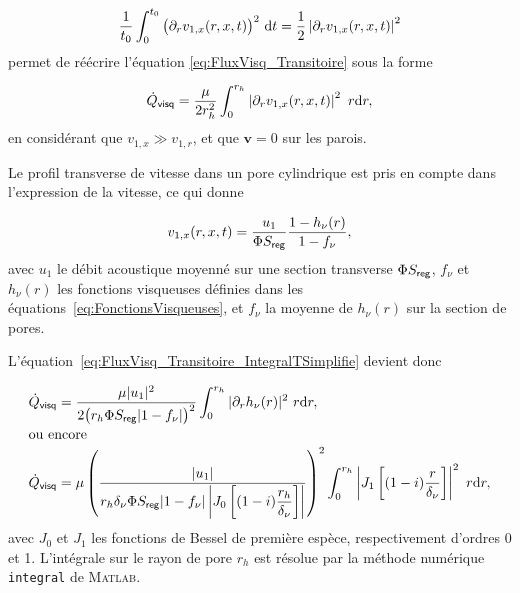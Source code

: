 \begin{enumerate}[label=\textbf{(\roman*)}]
\begin{equation*}
\frac{1}{t_0}\int_{0}^{t_0}\big(\partial_r v_{1,x}(r,x,t)\big)^2\ \mathrm{d} t = \frac12\left|\partial_r v_{1,x}(r,x,t)\right|^2
\end{equation*}
permet de réécrire l'équation \eqref{eq:FluxVisq_Transitoire} sous la forme

\begin{equation}
	\dot Q_{\sf visq} = \frac{\mu}{2r_h^2} \int_{0}^{r_h} \left|\partial_r v_{1,x}(r,x,t)\right|^2\ r \mathrm{d} r,
	\label{eq:FluxVisq_Transitoire_IntegralTSimplifie}
\end{equation}
en considérant que $v_{1,x} \gg v_{1,r}$, et que $\mathbf v=0$ sur les parois.

Le profil transverse de vitesse dans un pore cylindrique est pris en compte dans l'expression de la vitesse, ce qui donne 

\begin{equation}
	v_{1,x}(r,x,t) = \frac{u_1}{\Phi S_{\sf reg}} \frac{1-h_\nu(r)}{1-f_\nu},
	\label{eq:lienVitesseDebit_PoreCylindrique}
\end{equation}
avec $u_1$ le débit acoustique moyenné sur une section transverse $\Phi S_{\sf reg}$, $f_\nu$ et $h_\nu(r)$ les fonctions visqueuses définies dans les équations~\eqref{eq:FonctionsVisqueuses}, et $f_\nu$ la moyenne de $h_\nu(r)$ sur la section de pores.

L'équation~\eqref{eq:FluxVisq_Transitoire_IntegralTSimplifie} devient donc

\begin{align}
	\dot Q_{\sf visq} &= \frac{\mu |u_1|^2}{2\big(r_h\Phi S_{\sf reg}|1-f_\nu|\big)^2}\int_0^{r_h} |\partial_r h_\nu(r)|^2\ r \deriv r, \nonumber\\ 
	\intertext{ou encore}
	\dot Q_{\sf visq} &= \mu \left(\frac{|u_1|}{r_h \delta_\nu \Phi S_{\sf reg} |1-f_\nu|\left|J_0\left[(1-i)\dfrac{r_h}{\delta_\nu}\right]\right|}\right)^2 \int_{0}^{r_h}\left|J_1\left[(1-i)\frac{r}{\delta_\nu}\right]\right|^2\ r \deriv r ,
\end{align}
avec $J_0$ et $J_1$ les fonctions de Bessel de première espèce, respectivement d'ordres \num{0} et \num{1}. L'intégrale sur le rayon de pore $r_h$ est résolue par la méthode numérique \texttt{integral} de \textsc{Matlab}\textss\textregistered.

%
%
%


\end{enumerate}
